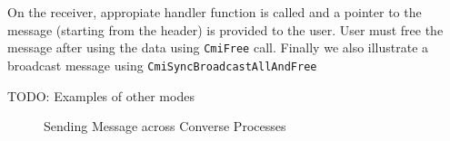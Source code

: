\documentclass[10pt]{report}
\begin{document}
On the receiver, appropiate handler function is called and a pointer to the message (starting from the header) is provided to the user. User must free the message after using the data using \texttt{CmiFree} call. Finally we also illustrate a broadcast message using \texttt{CmiSyncBroadcastAllAndFree}

TODO: Examples of other modes

\begin{figure}

\caption{Sending Message across Converse Processes}
\label{fig:converse-pingpong}
\end{figure}
\end{document}

